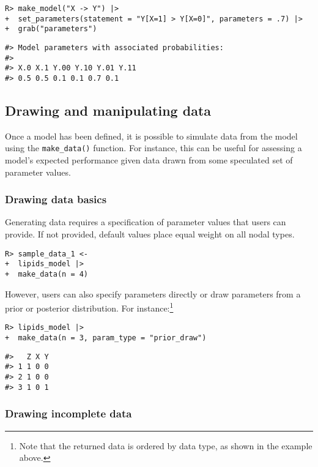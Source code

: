 \documentclass[
  11pt,
  article]{jss}
\begin{document}
\begin{verbatim}
R> make_model("X -> Y") |>
+  set_parameters(statement = "Y[X=1] > Y[X=0]", parameters = .7) |>
+  grab("parameters")
\end{verbatim}

\begin{verbatim}
#> Model parameters with associated probabilities: 
#> 
#> X.0 X.1 Y.00 Y.10 Y.01 Y.11
#> 0.5 0.5 0.1 0.1 0.7 0.1
\end{verbatim}

\subsection{Drawing and manipulating
data}\label{drawing-and-manipulating-data}

Once a model has been defined, it is possible to simulate data from the
model using the \texttt{make\_data()} function. For instance, this can
be useful for assessing a model's expected performance given data drawn
from some speculated set of parameter values.

\subsubsection{Drawing data basics}\label{drawing-data-basics}

Generating data requires a specification of parameter values that users
can provide. If not provided, default values place equal weight on all
nodal types.

\begin{verbatim}
R> sample_data_1 <- 
+  lipids_model |> 
+  make_data(n = 4)
\end{verbatim}

However, users can also specify parameters directly or draw parameters
from a prior or posterior distribution. For instance:\footnote{Note that
  the returned data is ordered by data type, as shown in the example
  above.}

\begin{verbatim}
R> lipids_model |>
+  make_data(n = 3, param_type = "prior_draw")
\end{verbatim}

\begin{verbatim}
#>   Z X Y
#> 1 1 0 0
#> 2 1 0 0
#> 3 1 0 1
\end{verbatim}

\subsubsection{Drawing incomplete data}\label{drawing-incomplete-data}
\end{document}
